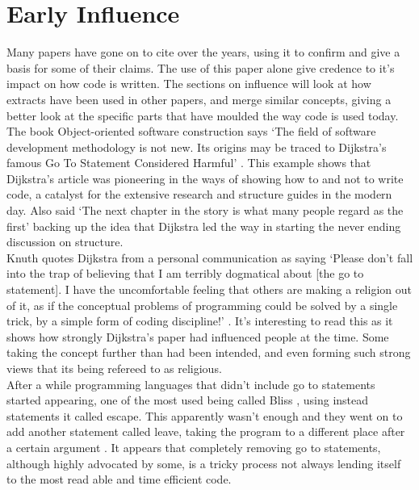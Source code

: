 \documentclass{scrartcl}
\begin{document}
\section{Early Influence}
Many papers have gone on to cite \cite{dijkstra2002go} over the years, using it to confirm and give a basis for some of their claims. The use of this paper alone give credence to it's impact on how code is written. The sections on influence will look at how extracts have been used in other papers, and merge similar concepts, giving a better look at the specific parts that have moulded the way code is used today.\\ 
The book Object-oriented software construction says `The field of software development methodology is not new. Its origins may be traced to Dijkstra’s famous Go To Statement Considered Harmful' \cite[p.664]{meyer1988object}. This example shows that Dijkstra's article was pioneering in the ways of showing how to and not to write code, a catalyst for the extensive research and structure guides in the modern day. Also said `The next chapter in the story is what many people regard as the first' \cite[p.265]{knuth1974structured} backing up the idea that Dijkstra led the way in starting the never ending discussion on structure.\\
Knuth quotes Dijkstra from a personal communication as saying `Please don't fall into the trap of
believing that I am terribly dogmatical about [the go to statement]. I have the uncomfortable feeling that others are making a religion out of it, as if the conceptual problems of programming could be solved by a single trick, by a simple form of coding discipline!' \cite[p.265]{knuth1974structured}. It's interesting to read this as it shows how strongly Dijkstra's paper had influenced people at the time. Some taking the concept further than had been intended, and even forming such strong views that its being refereed to as religious.\\
After a while programming languages that didn't include go to statements started appearing, one of the most used being called Bliss \cite{wulf1971bliss}, using instead statements it called escape. This apparently wasn't enough and they went on to add another statement called leave, taking the program to a different place after a certain argument \cite{wulf1972case}. It appears that completely removing go to statements, although highly advocated by some, is a tricky process not always lending itself to the most read able and time efficient code. \\
\end{document}
